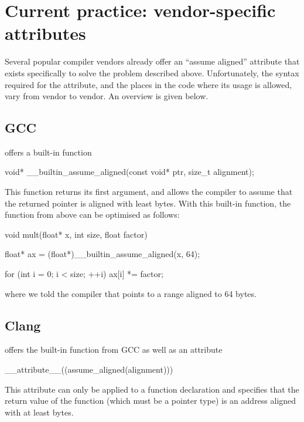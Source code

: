 \section{Current practice: vendor-specific attributes}

Several popular compiler vendors already offer an ``assume aligned'' attribute that exists specifically to solve the problem described above. Unfortunately, the syntax required for the attribute, and the places in the code where its usage is allowed, vary from vendor to vendor. An overview is given below.

\subsection{GCC}
\label{gcc}

\cite{GCC} offers a built-in function 

\begin{codeblock}
void* __builtin_assume_aligned(const void* ptr, size_t alignment);
\end{codeblock}

This function returns its first argument, and allows the compiler to assume that the returned pointer is aligned with least  bytes. With this built-in function, the function  from above can be optimised as follows: 

\begin{codeblock}
void mult(float* x, int size, float factor)
{
    float* ax = (float*)__builtin_assume_aligned(x, 64);
    
    for (int i = 0; i < size; ++i)
        ax[i] *= factor;
}
\end{codeblock}
where we told the compiler that  points to a range aligned to 64 bytes.

\subsection{Clang}

\cite{Clang} offers the built-in function  from GCC as well as an attribute

\begin{codeblock}
__attribute__((assume_aligned(alignment)))
\end{codeblock}

This attribute can only be applied to a function declaration and specifies that the return value of the function (which must be a pointer type) is an address aligned with at least  bytes.

